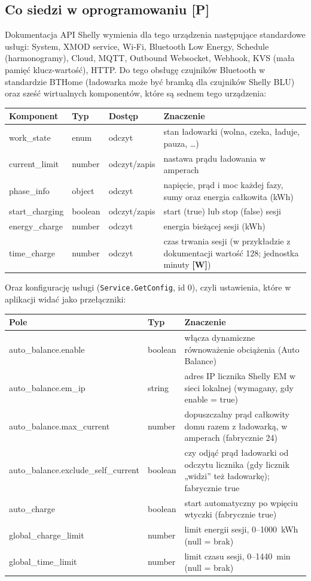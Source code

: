 \documentclass[11pt,a4paper]{article}
\newcommand{\tagP}{\textcolor{apgreen}{\textbf{[P]}}}
\newcommand{\tagW}{\textcolor{apamber}{\textbf{[W]}}}
\newcommand{\code}[1]{\texttt{#1}}
\begin{document}
\subsection{Co siedzi w oprogramowaniu \tagP}

Dokumentacja API Shelly wymienia dla tego urządzenia następujące standardowe usługi: System, XMOD service, Wi-Fi, Bluetooth Low Energy, Schedule (harmonogramy), Cloud, MQTT, Outbound Websocket, Webhook, KVS (mała pamięć klucz-wartość), HTTP. Do tego obsługę czujników Bluetooth w standardzie BTHome (ładowarka może być bramką dla czujników Shelly BLU) oraz sześć wirtualnych komponentów, które są sednem tego urządzenia:

\begin{tabularx}{\textwidth}{>{\ttfamily}p{3.1cm}p{2.1cm}p{1.9cm}X}
\toprule
\textrm{\textbf{Komponent}} & \textbf{Typ} & \textbf{Dostęp} & \textbf{Znaczenie} \\
\midrule
work\_state & enum & odczyt & stan ładowarki (wolna, czeka, ładuje, pauza, …) \\
current\_limit & number & odczyt/zapis & nastawa prądu ładowania w amperach \\
phase\_info & object & odczyt & napięcie, prąd i moc każdej fazy, sumy oraz energia całkowita (kWh) \\
start\_charging & boolean & odczyt/zapis & start (true) lub stop (false) sesji \\
energy\_charge & number & odczyt & energia bieżącej sesji (kWh) \\
time\_charge & number & odczyt & czas trwania sesji (w przykładzie z dokumentacji wartość 128; jednostka minuty \tagW) \\
\bottomrule
\end{tabularx}

Oraz konfigurację usługi (\code{Service.GetConfig}, id 0), czyli ustawienia, które w aplikacji widać jako przełączniki:

\begin{tabularx}{\textwidth}{>{\ttfamily}p{5.5cm}p{1.5cm}X}
\toprule
\textrm{\textbf{Pole}} & \textbf{Typ} & \textbf{Znaczenie} \\
\midrule
auto\_balance.enable & boolean & włącza dynamiczne równoważenie obciążenia (Auto Balance) \\
auto\_balance.em\_ip & string & adres IP licznika Shelly EM w sieci lokalnej (wymagany, gdy enable = true) \\
auto\_balance.max\_current & number & dopuszczalny prąd całkowity domu razem z ładowarką, w amperach (fabrycznie 24) \\
auto\_balance.exclude\_self\_current & boolean & czy odjąć prąd ładowarki od odczytu licznika (gdy licznik „widzi” też ładowarkę); fabrycznie true \\
auto\_charge & boolean & start automatyczny po wpięciu wtyczki (fabrycznie true) \\
global\_charge\_limit & number & limit energii sesji, 0–1000~kWh (null = brak) \\
global\_time\_limit & number & limit czasu sesji, 0–1440~min (null = brak) \\
\bottomrule
\end{tabularx}
\end{document}
